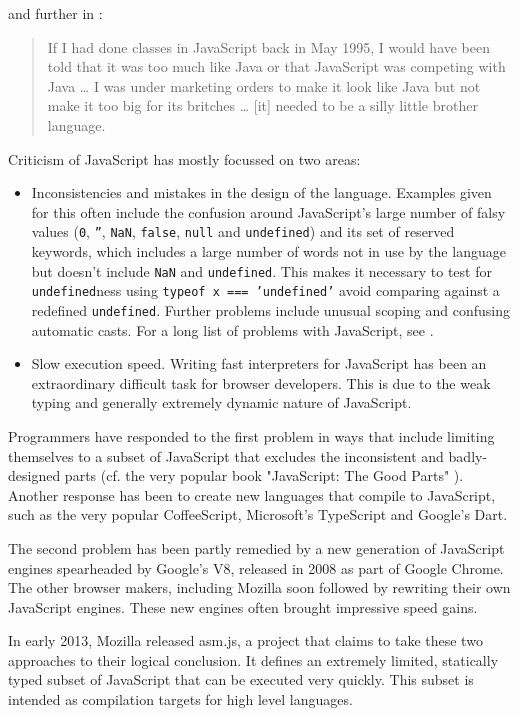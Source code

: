 \documentclass[11pt]{report}
\begin{document}
and further in \cite{comparticle}:

\begin{quote}
If I had done classes in JavaScript back in May 1995, I would have been told that it was too much like Java or that JavaScript was competing with Java … I was under marketing orders to make it look like Java but not make it too big for its britches … [it] needed to be a silly little brother language.
\end{quote}


Criticism of JavaScript has mostly focussed on two areas:
\begin{itemize}
\item Inconsistencies and mistakes in the design of the language. Examples given for this often include the confusion around JavaScript's large number of falsy values (\texttt{0},  \texttt{''}, \texttt{NaN}, \texttt{false}, \texttt{null} and \texttt{undefined}) and its set of reserved keywords, which includes a large number of words not in use by the language but doesn't include \texttt{NaN} and \texttt{undefined}. This makes it necessary to test for \texttt{undefined}ness using \mbox{\texttt{typeof x === 'undefined'}} avoid comparing against a redefined \texttt{undefined}. Further problems include unusual scoping and confusing automatic casts. For a long list of problems with JavaScript, see \cite{jsgoodparts}.
\item Slow execution speed. Writing fast interpreters for JavaScript has been an extraordinary difficult task for browser developers. This is due to the weak typing and generally extremely dynamic nature of JavaScript.
\end{itemize}


Programmers have responded to the first problem in ways that include limiting themselves to a subset of JavaScript that excludes the inconsistent and badly-designed parts (cf. the very popular book "JavaScript: The Good Parts" \cite{jsgoodparts}). Another response has been to create new languages that compile to JavaScript, such as the very popular CoffeeScript, Microsoft's TypeScript and Google's Dart.

The second problem has been partly remedied by a new generation of JavaScript engines spearheaded by Google's V8, released in 2008 as part of Google Chrome. The other browser makers, including Mozilla soon followed by rewriting their own JavaScript engines. These new engines often brought impressive speed gains.

In early 2013, Mozilla released asm.js, a project that claims to take these two approaches to their logical conclusion. It defines an extremely limited, statically typed subset of JavaScript that can be executed very quickly. This subset is intended as compilation targets for high level languages.
\end{document}
